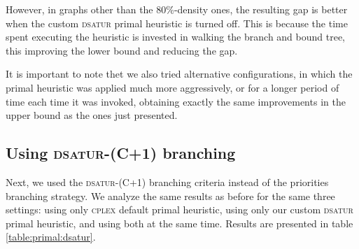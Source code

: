 However, in graphs other than the 80\%-density ones, the resulting gap is better when the custom \textsc{dsatur} primal heuristic is turned off. This is because the time spent executing the heuristic is invested in walking the branch and bound tree, this improving the lower bound and reducing the gap.

It is important to note thet we also tried alternative configurations, in which the primal heuristic was applied much more aggressively, or for a longer period of time each time it was invoked, obtaining exactly the same improvements in the upper bound as the ones just presented.


\subsection{Using \textsc{dsatur-(C+1)} branching}

Next, we used the \textsc{dsatur-(C+1)} branching criteria instead of the priorities branching strategy. We analyze the same results as before for the same three settings: using only \textsc{cplex} default primal heuristic, using only our custom \textsc{dsatur} primal heuristic, and using both at the same time. Results are presented in table \ref{table:primal:dsatur}.


